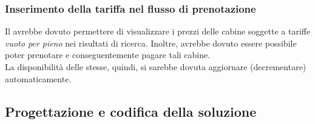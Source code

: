 \subsubsection{Inserimento della tariffa nel flusso di prenotazione}
Il \bookingEngine\hphantom{i}avrebbe dovuto permettere di visualizzare i prezzi delle cabine soggette a tariffe \textit{vuoto per pieno} nei risultati di ricerca. Inoltre, avrebbe dovuto essere possibile poter prenotare e conseguentemente pagare tali cabine.\\La disponibilità delle stesse, quindi, si sarebbe dovuta aggiornare (decrementare) automaticamente.

\subsection{Progettazione e codifica della soluzione}
